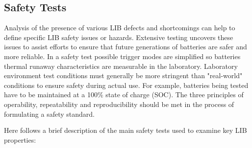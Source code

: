 \subsection{Safety Tests}
\label{sec:safety-tests}
Analysis of the presence of various LIB defects and shortcomings can help to define specific LIB safety issues or hazards. Extensive testing uncovers these issues to assist efforts to ensure that future generations of batteries are safer and more reliable. In a safety test possible trigger modes are simplified so batteries thermal runaway characteristics are measurable in the laboratory. Laboratory environment test conditions must generally be more stringent than "real-world" conditions to ensure safety during actual use. For example, batteries being tested have to be maintained at a 100\% state of charge (SOC). The three principles of operability, repeatability and reproducibility should be met in the process of formulating a safety standard. 

Here follows a brief description of the main safety tests used to examine key LIB properties:

